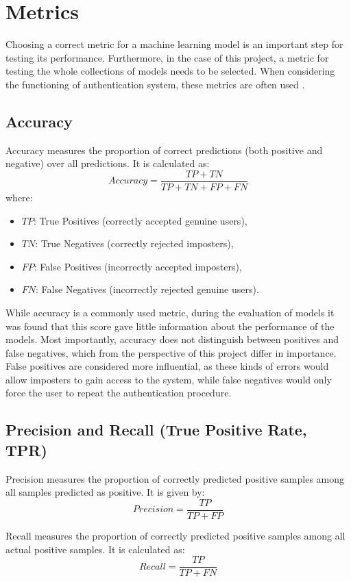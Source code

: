 \section{Metrics}
Choosing a correct metric for a machine learning model is an important step for testing its performance. Furthermore, in the case of this project, a metric for testing the whole collections of models needs to be selected.
When considering the functioning of authentication system, these metrics are often used \cite{traore2011continuous}. 

\subsection{Accuracy}
Accuracy measures the proportion of correct predictions (both positive and negative) over all predictions. It is calculated as:
\[
Accuracy = \frac{TP + TN}{TP + TN + FP + FN}
\]
where:
\begin{itemize}
	\item $TP$: True Positives (correctly accepted genuine users),
	\item $TN$: True Negatives (correctly rejected imposters),
	\item $FP$: False Positives (incorrectly accepted imposters),
	\item $FN$: False Negatives (incorrectly rejected genuine users).
\end{itemize}

While accuracy is a commonly used metric, during the evaluation of models it was found that this score gave little information about the performance of the models. Most importantly, accuracy does not distinguish between positives and false negatives, which from the perspective of this project differ in importance. False positives are considered more influential, as these kinds of errors would allow imposters to gain access to the system, while false negatives would only force the user to repeat the authentication procedure.

\subsection{Precision and Recall (True Positive Rate, TPR)}
Precision measures the proportion of correctly predicted positive samples among all samples predicted as positive. It is given by:
\[
Precision = \frac{TP}{TP + FP}
\]

Recall measures the proportion of correctly predicted positive samples among all actual positive samples. It is calculated as:
\[
Recall = \frac{TP}{TP + FN}
\]


